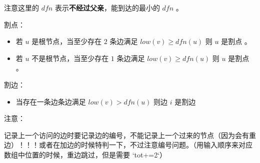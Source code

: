 注意这里的 $dfn$ 表示\textbf{不经过父亲}，能到达的最小的 $dfn$ 。

割点：
\begin{itemize}
    \item 若 $u$ 是根节点，当至少存在 $2$ 条边满足 $low(v)\ge dfn(u)$ 则 $u$ 是割点 。
    \item 若 $u$ 不是根节点，当至少存在 $1$ 条边满足 $low(v)\ge dfn(u)$ 则 $u$ 是割点 。
\end{itemize}

割边：
\begin{itemize}
    \item 当存在一条边条边满足 $low(v)>dfn(u)$ 则边 $i$ 是割边
\end{itemize}

注意：

记录上一个访问的边时要记录边的编号，不能记录上一个过来的节点（因为会有重边）！！！或者在加边的时候特判一下，不过注意编号问题。（用输入顺序来对应数组中位置的时候，重边跳过，但是需要 `tot+=2`）


